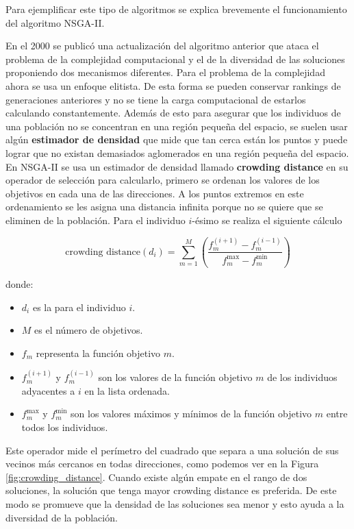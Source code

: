 Para ejemplificar este tipo de algoritmos se explica brevemente el funcionamiento del algoritmo NSGA-II.  

En el 2000 se publicó \cite{debFastElitistNondominated2000} una actualización del algoritmo anterior que ataca el problema de la complejidad computacional y el de la diversidad de las soluciones proponiendo dos mecanismos diferentes. Para el problema de la complejidad ahora se usa un enfoque elitista. De esta forma se pueden conservar rankings de generaciones anteriores y no se tiene la carga computacional de estarlos calculando constantemente. Además de esto para asegurar que los individuos de una población no se concentran en una región pequeña del espacio, se suelen usar algún \textbf{estimador de densidad} que mide que tan cerca están los puntos y puede lograr que no existan demasiados aglomerados en una región pequeña del espacio. En NSGA-II se usa un estimador de densidad llamado \textbf{crowding distance} en su operador de selección para calcularlo, primero se ordenan los valores de los objetivos en cada una de las direcciones. A los puntos extremos en este ordenamiento se les asigna una distancia infinita porque no se quiere que se eliminen de la población. Para el individuo $i$-ésimo se realiza el siguiente cálculo

\begin{equation} \label{eq:crowding_distance}    
    \text{crowding distance} (d_i) = \sum_{m=1}^M \left( \frac{f_m^{(i+1)} - f_m^{(i-1)}}{f_m^{\text{max}} - f_m^{\text{min}}} \right)
\end{equation}

donde:
\begin{itemize}
    \item \(d_i\) es la  para el individuo \(i\).
    \item \(M\) es el número de objetivos.
    \item \(f_m\) representa la función objetivo \(m\).
    \item \(f_m^{(i+1)}\) y \(f_m^{(i-1)}\) son los valores de la función objetivo \(m\) de los individuos adyacentes a \(i\) en la lista ordenada.
    \item \(f_m^{\text{max}}\) y \(f_m^{\text{min}}\) son los valores máximos y mínimos de la función objetivo \(m\) entre todos los individuos.
\end{itemize}

Este operador mide el perímetro del cuadrado que separa a una solución de sus vecinos más cercanos en todas direcciones, como podemos ver en la Figura \ref{fig:crowding_distance}.  Cuando existe algún empate en el rango de dos soluciones, la solución que tenga mayor crowding distance es preferida. De este modo se promueve que la densidad de las soluciones sea menor y esto ayuda a la diversidad de la población. 

